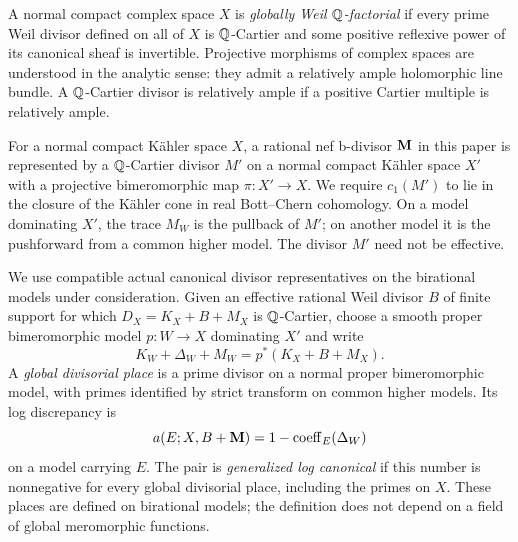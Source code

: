 A normal compact complex space \(X\) is \emph{globally Weil \(\mathbb{Q}\)-factorial} if every prime Weil divisor defined on all of \(X\) is \(\mathbb{Q}\)-Cartier and some positive reflexive power of its canonical sheaf is invertible. Projective morphisms of complex spaces are understood in the analytic sense: they admit a relatively ample holomorphic line bundle. A \(\mathbb{Q}\)-Cartier divisor is relatively ample if a positive Cartier multiple is relatively ample.

For a normal compact K\"ahler space \(X\), a rational nef b-divisor \(\mathbf{M}\) in this paper is represented by a \(\mathbb{Q}\)-Cartier divisor \(M'\) on a normal compact K\"ahler space \(X'\) with a projective bimeromorphic map \(\pi:X'\to X\). We require \(c_1(M')\) to lie in the closure of the K\"ahler cone in real Bott--Chern cohomology. On a model dominating \(X'\), the trace \(M_W\) is the pullback of \(M'\); on another model it is the pushforward from a common higher model. The divisor \(M'\) need not be effective.

We use compatible actual canonical divisor representatives on the birational models under consideration. Given an effective rational Weil divisor \(B\) of finite support for which \(D_X=K_X+B+M_X\) is \(\mathbb{Q}\)-Cartier, choose a smooth proper bimeromorphic model \(p:W\to X\) dominating \(X'\) and write
\begin{equation}\label{eq:discrepancy-definition}
 K_W+\Delta_W+M_W=p^*(K_X+B+M_X).
\end{equation}
A \emph{global divisorial place} is a prime divisor on a normal proper bimeromorphic model, with primes identified by strict transform on common higher models. Its log discrepancy is
\[
 a(E;X,B+\mathbf{M})=1-\operatorname{coeff}_E(\Delta_W)
\]
on a model carrying \(E\). The pair is \emph{generalized log canonical} if this number is nonnegative for every global divisorial place, including the primes on \(X\). These places are defined on birational models; the definition does not depend on a field of global meromorphic functions.

